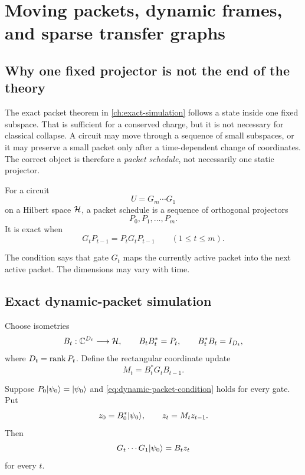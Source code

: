 \chapter{Moving packets, dynamic frames, and sparse transfer graphs}
\label{ch:dynamic-frames}

\section{Why one fixed projector is not the end of the theory}
The exact packet theorem in \cref{ch:exact-simulation} follows a state inside one fixed subspace. That is sufficient for a conserved charge, but it is not necessary for classical collapse. A circuit may move through a sequence of small subspaces, or it may preserve a small packet only after a time-dependent change of coordinates. The correct object is therefore a \emph{packet schedule}, not necessarily one static projector.

\begin{definition}
For a circuit
\[
U=G_m\cdots G_1
\]
on a Hilbert space $\mathcal H$, a packet schedule is a sequence of orthogonal projectors
\[
P_0,P_1,\ldots,P_m.
\]
It is exact when
\begin{equation}
G_tP_{t-1}=P_tG_tP_{t-1}
\qquad(1\le t\le m).
\label{eq:dynamic-packet-condition}
\end{equation}
\end{definition}

The condition says that gate $G_t$ maps the currently active packet into the next active packet. The dimensions may vary with time.

\section{Exact dynamic-packet simulation}
Choose isometries
\[
B_t:\mathbb C^{D_t}\longrightarrow\mathcal H,
\qquad
B_tB_t^*=P_t,
\qquad
B_t^*B_t=I_{D_t},
\]
where $D_t=\operatorname{rank} P_t$. Define the rectangular coordinate update
\begin{equation}
M_t=B_t^*G_tB_{t-1}.
\label{eq:dynamic-coordinate-update}
\end{equation}

\begin{theorem}
\label{thm:dynamic-packet}
Suppose $P_0\lvert \psi_0\rangle=\lvert \psi_0\rangle$ and \cref{eq:dynamic-packet-condition} holds for every gate. Put
\[
z_0=B_0^*\lvert \psi_0\rangle,
\qquad
z_t=M_tz_{t-1}.
\]
Then
\[
G_t\cdots G_1\lvert \psi_0\rangle=B_tz_t
\]
for every $t$.
\end{theorem}

